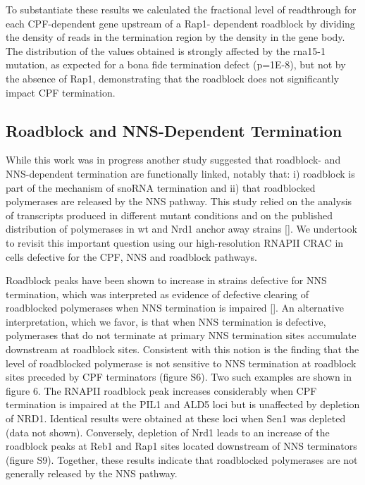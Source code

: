 To substantiate these results we calculated the fractional level of readthrough for each CPF-dependent gene upstream of a Rap1- dependent roadblock by dividing the density of reads in the termination region by the density in the gene body. The distribution of the values obtained is strongly affected by the rna15-1 mutation, as expected for a bona fide termination defect (p=1E-8), but not by the absence of Rap1, demonstrating that the roadblock does not significantly impact CPF termination. 

\singlespacing
\subsection*{Roadblock and NNS-Dependent Termination}
\doublespacing

While this work was in progress another study suggested that roadblock- and NNS-dependent termination are functionally linked, notably that: i) roadblock is part of the mechanism of snoRNA termination and ii) that roadblocked polymerases are released by the NNS pathway. This study relied on the analysis of transcripts produced in different mutant conditions and on the published distribution of polymerases in wt and Nrd1 anchor away strains []. We undertook to revisit this important question using our high-resolution RNAPII CRAC in cells defective for the CPF, NNS and roadblock pathways. 

Roadblock peaks have been shown to increase in strains defective for NNS termination, which was interpreted as evidence of defective clearing of roadblocked polymerases when NNS termination is impaired []. An alternative interpretation, which we favor, is that when NNS termination is defective, polymerases that do not terminate at primary NNS termination sites accumulate downstream at roadblock sites.  Consistent with this notion is the finding that the level of roadblocked polymerase is not sensitive to NNS termination at roadblock sites preceded by CPF terminators (figure S6). Two such examples are shown in figure 6. The RNAPII roadblock peak increases considerably when CPF termination is impaired at the PIL1 and ALD5 loci but is unaffected by depletion of NRD1. Identical results were obtained at these loci when Sen1 was depleted (data not shown). Conversely, depletion of Nrd1 leads to an increase of the roadblock peaks at Reb1 and Rap1 sites located downstream of NNS terminators (figure S9). Together, these results indicate that roadblocked polymerases are not generally released by the NNS pathway. 

